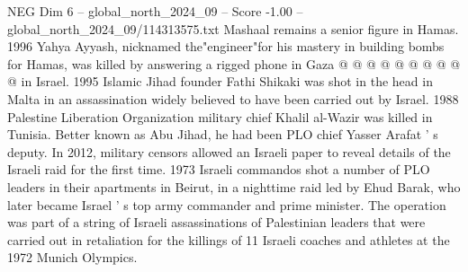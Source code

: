 \begin{textsample}{NEG Dim 6 – global\_north\_2024\_09 – Score -1.00 – global\_north\_2024\_09/114313575.txt}
Mashaal remains a senior figure in Hamas. 1996 Yahya Ayyash, nicknamed the"engineer"for his mastery in building bombs for Hamas, was killed by answering a rigged phone in Gaza @ @ @ @ @ @ @ @ @ @ in Israel. 1995 Islamic Jihad founder Fathi Shikaki was shot in the head in Malta in an assassination widely believed to have been carried out by Israel. 1988 Palestine Liberation Organization military chief Khalil al-Wazir was killed in Tunisia.
Better known as Abu Jihad, he had been PLO chief Yasser Arafat ' s deputy.
In 2012, military censors allowed an Israeli paper to reveal details of the Israeli raid for the first time. 1973 Israeli commandos shot a number of PLO leaders in their apartments in Beirut, in a nighttime raid led by Ehud Barak, who later became Israel ' s top army commander and prime minister.
The operation was part of a string of Israeli assassinations of Palestinian leaders that were carried out in retaliation for the killings of 11 Israeli coaches and athletes at the 1972 Munich Olympics.

\end{textsample}

